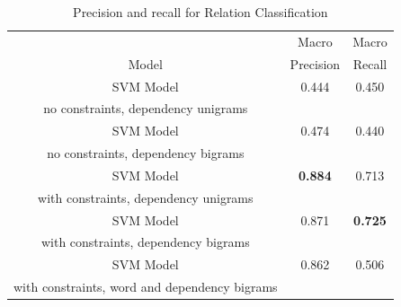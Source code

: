 \documentclass[12pt]{article}
\begin{document}
\begin{table}[!ht]
\center
\begin{tabular}{c||c|c}
	 & Macro & Macro \\
	Model & Precision & Recall \\
	\hline
	\hline
	SVM Model & 0.444 & 0.450 \\
	no constraints, dependency unigrams & & \\ \hline
	SVM Model & 0.474 & 0.440 \\
	no constraints, dependency bigrams & & \\ \hline
	SVM Model & \textbf{0.884} & 0.713 \\
	with constraints, dependency unigrams & & \\ \hline
	SVM Model & 0.871 & \textbf{0.725} \\
	with constraints, dependency bigrams & & \\ \hline
	SVM Model & 0.862 & 0.506 \\
	with constraints, word and dependency bigrams & & \\ \hline
\end{tabular}
\caption{\label{recallRelationClassification} Precision and recall for Relation Classification}
\end{table}
\end{document}

